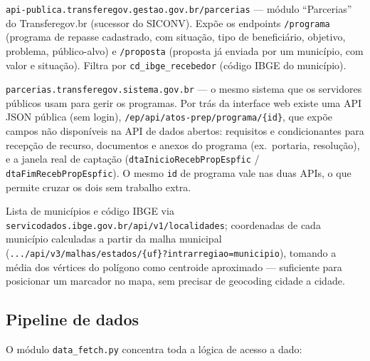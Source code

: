 \documentclass[11pt,a4paper]{article}
\newcommand{\codigo}[1]{\texttt{\small #1}}
\begin{document}
\begin{description}[leftmargin=1.2cm,style=nextline]
  \item[API de dados abertos] \codigo{api-publica.transferegov.gestao.gov.br/parcerias} ---
    módulo ``Parcerias'' do Transferegov.br (sucessor do SICONV). Expõe os endpoints
    \codigo{/programa} (programa de repasse cadastrado, com situação, tipo de beneficiário,
    objetivo, problema, público-alvo) e \codigo{/proposta} (proposta já enviada por um
    município, com valor e situação). Filtra por \codigo{cd\_ibge\_recebedor} (código IBGE do
    município).
  \item[Portal do Transferegov (detalhe rico)] \codigo{parcerias.transferegov.sistema.gov.br}
    --- o mesmo sistema que os servidores públicos usam para gerir os programas. Por trás da
    interface web existe uma API JSON pública (sem login),
    \codigo{/ep/api/atos-prep/programa/\{id\}}, que expõe campos não disponíveis na API de
    dados abertos: requisitos e condicionantes para recepção de recurso, documentos e anexos
    do programa (ex.\ portaria, resolução), e a janela real de captação
    (\codigo{dtaInicioRecebPropEspfic} / \codigo{dtaFimRecebPropEspfic}). O mesmo \codigo{id}
    de programa vale nas duas APIs, o que permite cruzar os dois sem trabalho extra.
  \item[IBGE] Lista de municípios e código IBGE via
    \codigo{servicodados.ibge.gov.br/api/v1/localidades}; coordenadas de cada município
    calculadas a partir da malha municipal
    (\codigo{.../api/v3/malhas/estados/\{uf\}?intrarregiao=municipio}), tomando a média dos
    vértices do polígono como centroide aproximado --- suficiente para posicionar um marcador
    no mapa, sem precisar de geocoding cidade a cidade.
\end{description}

\subsection{Pipeline de dados}

O módulo \codigo{data\_fetch.py} concentra toda a lógica de acesso a dado:
\end{document}
